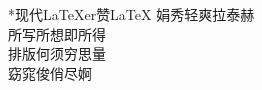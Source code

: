 \documentclass[margin=18pt,
  convert,
  convert={
    outext=.png,
    command=\unexpanded{
      pdftocairo -r 600 -png \infile %
    }
  }
]{standalone}
\begin{document}
\begin{minipage}{6in}
  \centering
  \begin{poem}*{现代}{\LaTeX{}er}{赞\textbullet{}\LaTeX{}}
    娟秀轻爽拉泰赫\\
    所写所想即所得\\
    排版何须穷思量\\
    窈窕俊俏尽婀
  \end{poem}

\end{minipage}
\end{document}
